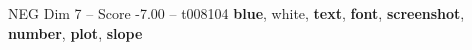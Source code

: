 \begin{textsample}{NEG Dim 7 – Score -7.00 – t008104}  \label{ex:f7_neg_040}
\textbf{blue}, white, \textbf{text}, \textbf{font}, \textbf{screenshot}, \textbf{number}, \textbf{plot}, \textbf{slope}

\end{textsample}
